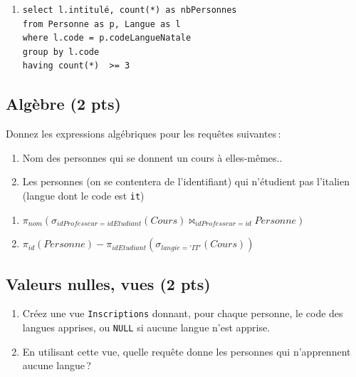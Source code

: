 \begin{solution}
\begin{enumerate}
   \item 
   
\begin{verbatim}
select l.intitulé, count(*) as nbPersonnes
from Personne as p, Langue as l
where l.code = p.codeLangueNatale
group by l.code
having count(*)  >= 3
\end{verbatim}
\end{enumerate}

\end{solution}


\subsection*{Algèbre (2 pts)}


Donnez les expressions algébriques pour les requêtes suivantes\,:

\begin{enumerate}
  \item Nom des personnes qui se donnent un cours à elles-mêmes..
  \item Les personnes (on se contentera de l'identifiant)
    qui n'étudient pas l'italien (langue dont le code est \texttt{it})
\end{enumerate}

\begin{solution}
\begin{enumerate}
  \item $\pi_{nom} (\sigma_{idProfesseur=idEtudiant}(Cours) \Join_{idProfesseur=id} Personne)$
  \item $\pi_{id} (Personne) -  \pi_{idEtudiant} (\sigma_{langie='IT'} (Cours))$
 \end{enumerate}

\end{solution}


\subsection*{Valeurs nulles, vues (2 pts)}

\begin{enumerate}
   \item Créez une vue \texttt{Inscriptions} donnant, pour chaque
         personne, le code des langues apprises, ou \texttt{NULL}
         si aucune langue n'est apprise.
      
      \item En utilisant cette vue, quelle requête donne les personnes
        qui n'apprennent aucune langue\,?
\end{enumerate}

